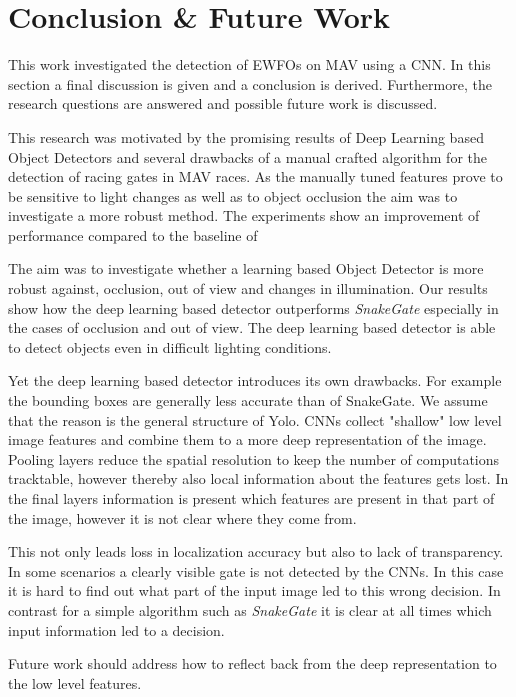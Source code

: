 \chapter{Conclusion \& Future Work}
\label{sec:conclusion}
This work investigated the detection of \acp{EWFO} on \ac{MAV} using a \ac{CNN}. In this section a final discussion is given and a conclusion is derived. Furthermore, the research questions are answered and possible future work is discussed.

This research was motivated by the promising results of Deep Learning based Object Detectors and several drawbacks of a manual crafted algorithm for the detection of racing gates in \ac{MAV} races. As the manually tuned features prove to be sensitive to light changes as well as to object occlusion the aim was to investigate a more robust method. The experiments show an improvement of performance compared to the baseline of 

 The aim was to investigate whether a learning based Object Detector is more robust against, occlusion, out of view and changes in illumination. Our results show how the deep learning based detector outperforms \textit{SnakeGate} especially in the cases of occlusion and out of view. The deep learning based detector is able to detect objects even in difficult lighting conditions.

Yet the deep learning based detector introduces its own drawbacks. For example the bounding boxes are generally less accurate than of SnakeGate. We assume that the reason is the general structure of \ac{Yolo}. \acp{CNN} collect "shallow" low level image features and combine them to a more deep representation of the image. Pooling layers reduce the spatial resolution to keep the number of computations tracktable, however thereby also local information about the features gets lost. In the final layers information is present which features are present in that part of the image, however it is not clear where they come from. 

This not only leads loss in localization accuracy but also to lack of transparency. In some scenarios a clearly visible gate is not detected by the \acp{CNN}. In this case it is hard to find out what part of the input image led to this wrong decision. In contrast for a simple algorithm such as  \textit{SnakeGate} it is clear at all times which input information led to a decision.

Future work should address how to reflect back from the deep representation to the low level features.

